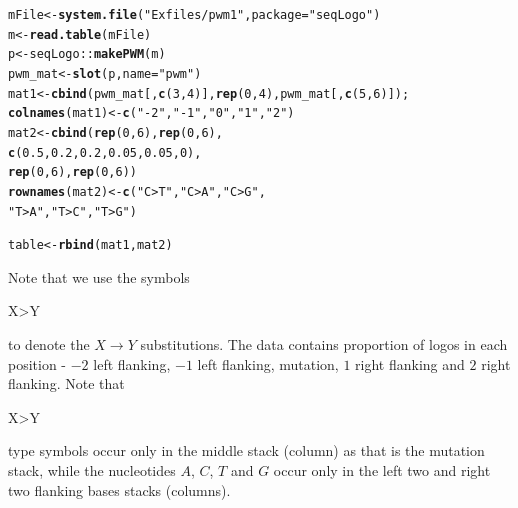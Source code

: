 \documentclass[12pt]{article}\usepackage[]{graphicx}\usepackage[usenames,dvipsnames]{color}
\makeatletter
\newcommand{\hlnum}[1]{\textcolor[rgb]{0.686,0.059,0.569}{#1}}%
\newcommand{\hlstr}[1]{\textcolor[rgb]{0.192,0.494,0.8}{#1}}%
\newcommand{\hlopt}[1]{\textcolor[rgb]{0,0,0}{#1}}%
\newcommand{\hlstd}[1]{\textcolor[rgb]{0.345,0.345,0.345}{#1}}%
\newcommand{\hlkwb}[1]{\textcolor[rgb]{0.69,0.353,0.396}{#1}}%
\newcommand{\hlkwc}[1]{\textcolor[rgb]{0.333,0.667,0.333}{#1}}%
\newcommand{\hlkwd}[1]{\textcolor[rgb]{0.737,0.353,0.396}{\textbf{#1}}}%
\newenvironment{kframe}{%
 \def\at@end@of@kframe{}%
 \ifinner\ifhmode%
  \def\at@end@of@kframe{\end{minipage}}%
  \begin{minipage}{\columnwidth}%
 \fi\fi%
 \def\FrameCommand##1{\hskip\@totalleftmargin \hskip-\fboxsep
 \colorbox{shadecolor}{##1}\hskip-\fboxsep
     \hskip-\linewidth \hskip-\@totalleftmargin \hskip\columnwidth}%
 \MakeFramed {\advance\hsize-\width
   \@totalleftmargin\z@ \linewidth\hsize
   \@setminipage}}%
 {\par\unskip\endMakeFramed%
 \at@end@of@kframe}
\newenvironment{knitrout}{}{} %
\makeatother
\begin{document}
\begin{knitrout}
\color{fgcolor}\begin{kframe}
\begin{alltt}
\hlstd{mFile} \hlkwb{<-} \hlkwd{system.file}\hlstd{(}\hlstr{"Exfiles/pwm1"}\hlstd{,} \hlkwc{package}\hlstd{=}\hlstr{"seqLogo"}\hlstd{)}
\hlstd{m} \hlkwb{<-} \hlkwd{read.table}\hlstd{(mFile)}
\hlstd{p} \hlkwb{<-} \hlstd{seqLogo}\hlopt{::}\hlkwd{makePWM}\hlstd{(m)}
\hlstd{pwm_mat} \hlkwb{<-} \hlkwd{slot}\hlstd{(p,}\hlkwc{name} \hlstd{=} \hlstr{"pwm"}\hlstd{)}
\hlstd{mat1} \hlkwb{<-} \hlkwd{cbind}\hlstd{(pwm_mat[,}\hlkwd{c}\hlstd{(}\hlnum{3}\hlstd{,}\hlnum{4}\hlstd{)],} \hlkwd{rep}\hlstd{(}\hlnum{0}\hlstd{,}\hlnum{4}\hlstd{), pwm_mat[,}\hlkwd{c}\hlstd{(}\hlnum{5}\hlstd{,}\hlnum{6}\hlstd{)]);}
\hlkwd{colnames}\hlstd{(mat1)} \hlkwb{<-} \hlkwd{c}\hlstd{(}\hlstr{"-2"}\hlstd{,} \hlstr{"-1"}\hlstd{,} \hlstr{"0"}\hlstd{,} \hlstr{"1"}\hlstd{,} \hlstr{"2"}\hlstd{)}
\hlstd{mat2} \hlkwb{<-} \hlkwd{cbind}\hlstd{(}\hlkwd{rep}\hlstd{(}\hlnum{0}\hlstd{,}\hlnum{6}\hlstd{),} \hlkwd{rep}\hlstd{(}\hlnum{0}\hlstd{,}\hlnum{6}\hlstd{),}
              \hlkwd{c}\hlstd{(}\hlnum{0.5}\hlstd{,} \hlnum{0.2}\hlstd{,} \hlnum{0.2}\hlstd{,} \hlnum{0.05}\hlstd{,} \hlnum{0.05}\hlstd{,} \hlnum{0}\hlstd{),}
              \hlkwd{rep}\hlstd{(}\hlnum{0}\hlstd{,}\hlnum{6}\hlstd{),} \hlkwd{rep}\hlstd{(}\hlnum{0}\hlstd{,}\hlnum{6}\hlstd{))}
\hlkwd{rownames}\hlstd{(mat2)} \hlkwb{<-} \hlkwd{c}\hlstd{(}\hlstr{"C>T"}\hlstd{,} \hlstr{"C>A"}\hlstd{,} \hlstr{"C>G"}\hlstd{,}
                    \hlstr{"T>A"}\hlstd{,} \hlstr{"T>C"}\hlstd{,} \hlstr{"T>G"}\hlstd{)}

\hlstd{table} \hlkwb{<-} \hlkwd{rbind}\hlstd{(mat1, mat2)}
\end{alltt}
\end{kframe}
\end{knitrout}

Note that we use the symbols \begin{verb} X>Y \end{verb} to denote the  $X \rightarrow Y$ substitutions. The data contains proportion of logos in each position -  $-2$ left flanking, $-1$ left flanking, mutation, $1$ right flanking and $2$ right flanking. Note that \begin{verb} X>Y \end{verb} type symbols occur only in the middle stack (column) as that is the mutation stack, while the nucleotides $A$, $C$, $T$ and $G$ occur only in the left two and right two flanking bases stacks (columns).
\end{document}
